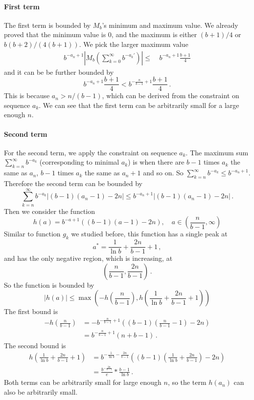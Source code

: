 \documentclass[]{article}
\begin{document}
\paragraph{First term}The first term is bounded by $M_b$'s minimum and maximum value. We already proved that the minimum value is 0, and the maximum is either $(b+1)/4$ or $b(b+2)/(4(b+1))$. We pick the larger maximum value
\begin{align*}
b^{-a_{n}+1}\left|M_b\left(\sum_{k=0}^\infty b^{-a_k'}\right)\right| \le&\ b^{-a_{n}+1}\frac{b+1}{4}                                                          
\end{align*}
and it can be be further bounded by
\[
b^{-a_{n}+1}\frac{b+1}{4} < b^{-\frac{n}{b-1}+1}\frac{b+1}{4}\,.
\]
This is because $a_{n}>n/(b-1)$, which can be derived from the constraint on sequence $a_k$. We can see that the first term can be arbitrarily small for a large enough $n$.

\paragraph{Second term} For the second term, we apply the constraint on sequence $a_k$. The maximum sum $\sum_{k=n}^\infty b^{-a_k}$ (corresponding to minimal $a_k$) is when there are $b-1$ times $a_k$ the same as $a_n$, $b-1$ times $a_k$ the same as $a_n +1$ and so on. So $\sum_{k=n}^\infty b^{-a_k} \le b^{-a_n + 1}$. Therefore the second term can be bounded by
 \[
 \sum_{k=n}^\infty b^{-a_k}\Big|(b-1)(a_{n}-1)-2n\Big| \le b^{-a_{n}+1}|(b-1)(a_{n}-1)-2n|\,.
 \]
Then we consider the function 
\[
	h(a) = b^{-a+1}((b-1)(a-1)-2n),\quad a \in \left(\frac{n}{b-1}, \infty\right)
\]
Similar to function $g_k$ we studied before, this function has a single peak at
\[
a^* = \frac{1}{\ln b} + \frac{2n}{b-1}+1\,,
\]
and has the only negative region, which is increasing, at
\[
\left(\frac{n}{b-1}, \frac{2n}{b-1}\right)\,.
\]
So the function is bounded by
\[
|h(a)| \le \max\left(-h\left(\frac{n}{b-1}\right), h\left(\frac{1}{\ln b} + \frac{2n}{b-1}+1\right)\right)
\]
The first bound is
\begin{align*}
-h\left(\frac{n}{b-1}\right) &=  -b^{-\frac{n}{b-1}+1}\left((b-1)\left(\frac{n}{b-1}-1\right)-2n\right)\\
&= b^{-\frac{n}{b-1}+1}(n+b-1)\,.
\end{align*}
The second bound is
\begin{align*}
 h\left(\frac{1}{\ln b} + \frac{2n}{b-1}+1\right) &= b^{-\frac{1}{\ln b} - \frac{2n}{b-1}}\left((b-1)\left(\frac{1}{\ln b} + \frac{2n}{b-1}\right)-2n\right)\\
  &= \frac{b^{- \frac{2n}{b-1}}}{e}*\frac{b-1}{\ln b}\,.
\end{align*}
Both terms can be arbitrarily small for large enough $n$, so the term $h(a_{n})$ can also be arbitrarily small.
\end{document}
